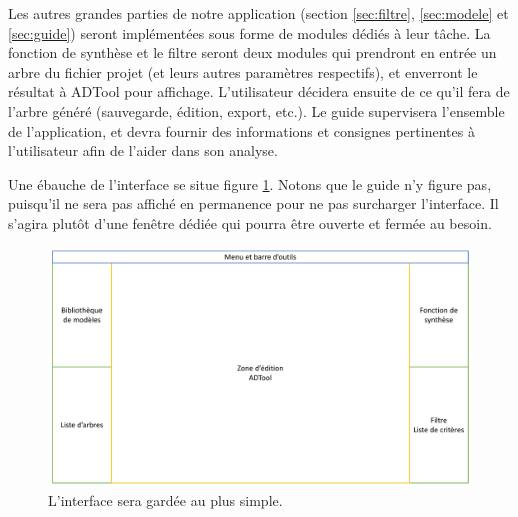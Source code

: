         Les autres grandes parties de notre application (section \ref{sec:filtre}, \ref{sec:modele} et \ref{sec:guide}) seront implémentées sous forme de modules dédiés à leur tâche.
        La fonction de synthèse et le filtre seront deux modules qui prendront en entrée un arbre du fichier projet (et leurs autres paramètres respectifs), et enverront le résultat à ADTool pour affichage. L'utilisateur décidera ensuite de ce qu'il fera de l'arbre généré (sauvegarde, édition, export, etc.).
        Le guide supervisera l'ensemble de l'application, et devra fournir des informations et consignes pertinentes à l'utilisateur afin de l'aider dans son analyse.

        Une ébauche de l'interface se situe figure \ref{fig:interface}. Notons que le guide n'y figure pas, puisqu'il ne sera pas affiché en permanence pour ne pas surcharger l'interface. Il s'agira plutôt d'une fenêtre dédiée qui pourra être ouverte et fermée au besoin.

        \begin{figure}
            \begin{center}
                \includegraphics[width=1\textwidth]{figure/interface.pdf}
            \end{center}
            \caption{L'interface sera gardée au plus simple.}
            \label{fig:interface}
        \end{figure}